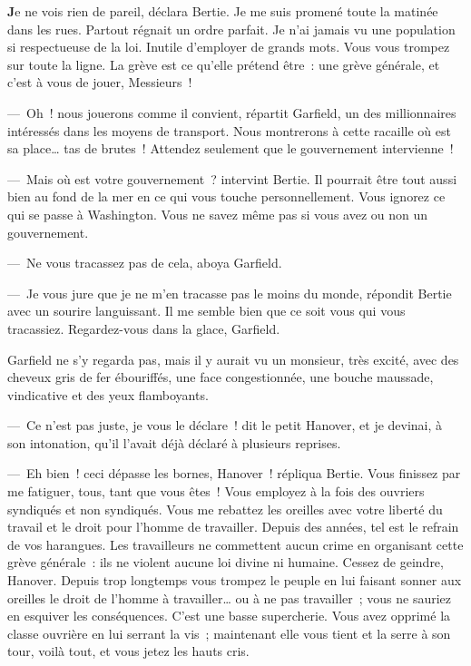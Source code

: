 \documentclass[french,twoside]{book} %
\newcommand{\astermono}{\medskip\centerline{\color{rubric}\large\selectfont{\syms ✻}}\medskip\par}%
\begin{document}
\astermono

\noindent \textbf{J}e ne vois rien de pareil, déclara Bertie. Je me suis promené toute la matinée dans les rues. Partout régnait un ordre parfait. Je n’ai jamais vu une population si respectueuse de la loi. Inutile d’employer de grands mots. Vous vous trompez sur toute la ligne. La grève est ce qu’elle prétend être : une grève générale, et c’est à vous de jouer, Messieurs !\par
— Oh ! nous jouerons comme il convient, répartit Garfield, un des millionnaires intéressés dans les moyens de transport. Nous montrerons à cette racaille où est sa place… tas de brutes ! Attendez seulement que le gouvernement intervienne !\par
— Mais où est votre gouvernement ? intervint Bertie. Il pourrait être tout aussi bien au fond de la mer en ce qui vous touche personnellement. Vous ignorez ce qui se passe à Washington. Vous ne savez même pas si vous avez ou non un gouvernement.\par
— Ne vous tracassez pas de cela, aboya Garfield.\par
— Je vous jure que je ne m’en tracasse pas le moins du monde, répondit Bertie avec un sourire languissant. Il me semble bien que ce soit vous qui vous tracassiez. Regardez-vous dans la glace, Garfield.\par
Garfield ne s’y regarda pas, mais il y aurait vu un monsieur, très excité, avec des cheveux gris de fer ébouriffés, une face congestionnée, une bouche maussade, vindicative et des yeux flamboyants.\par
— Ce n’est pas juste, je vous le déclare ! dit le petit Hanover, et je devinai, à son intonation, qu’il l’avait déjà déclaré à plusieurs reprises.\par
— Eh bien ! ceci dépasse les bornes, Hanover ! répliqua Bertie. Vous finissez par me fatiguer, tous, tant que vous êtes ! Vous employez à la fois des ouvriers syndiqués et non syndiqués. Vous me rebattez les oreilles avec votre liberté du travail et le droit pour l’homme de travailler. Depuis des années, tel est le refrain de vos harangues. Les travailleurs ne commettent aucun crime en organisant cette grève générale : ils ne violent aucune loi divine ni humaine. Cessez de geindre, Hanover. Depuis trop longtemps vous trompez le peuple en lui faisant sonner aux oreilles le droit de l’homme à travailler… ou à ne pas travailler ; vous ne sauriez en esquiver les conséquences. C’est une basse supercherie. Vous avez opprimé la classe ouvrière en lui serrant la vis ; maintenant elle vous tient et la serre à son tour, voilà tout, et vous jetez les hauts cris.\par
\end{document}
